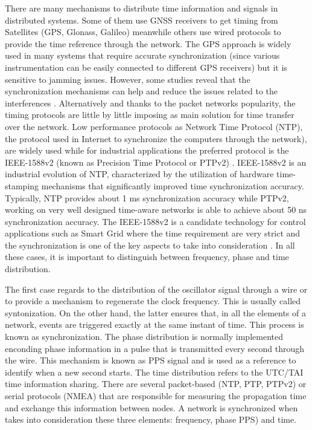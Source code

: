 There are many mechanisms to distribute time information and signals in distributed systems. Some of them use GNSS receivers to get timing from Satellites (GPS, Glonass, 
Galileo) meanwhile others use wired protocols to provide the time reference 
through the network. The GPS approach is widely used in many systems that require accurate synchronization (since various instrumentation can be easily connected to different GPS receivers) but it is sensitive to jamming issues. However, some studies reveal that the synchronization mechanisms can help and reduce the issues related to the interferences \cite{NOURA2016130}. Alternatively and thanks to the packet networks popularity, the timing protocols are little by little imposing as main solution for time transfer over the network. Low performance protocols as Network Time Protocol (NTP), the protocol used in Internet to synchronize the computers through the network), \cite{ntf:ntp_std} are widely used while for industrial applications the preferred protocol is the IEEE-1588v2 (known as Precision Time Protocol or PTPv2) \cite{ieee:ieee1588_std} \cite{itu:TG8275_1_Y_1369_1}. IEEE-1588v2 is an industrial evolution of NTP, characterized by the utilization of hardware time-stamping mechanisms that significantly improved time synchronization accuracy. Typically, NTP provides about 1 ms synchronization accuracy while PTPv2, working on very well designed time-aware networks is able to achieve about 50 ns synchronization accuracy. The IEEE-1588v2 is a candidate technology for control applications such as Smart Grid \cite{NAFI201623} where the time requirement are very strict and the synchronization is one of the key aspects to take into consideration \cite{COLAK2016396}.
In all these cases, it is important to distinguish between frequency, phase and time distribution.

The first case regards to the distribution of the oscillator signal through a wire or to provide a mechanism to regenerate the clock frequency. This is usually  called syntonization. On the other hand, the latter ensures that, in all the elements of a network, events are triggered exactly at the same instant of time. This process is known as synchronization.
The phase distribution is normally implemented enconding phase information in a pulse that is transmitted every second through the wire. This mechanism is known as PPS signal and is used as a reference to identify when a new second starts.
The time distribution refers to the UTC/TAI time information sharing. There are several packet-based (NTP, PTP, PTPv2) or serial protocols (NMEA) that are responsible for measuring the propagation time and exchange this information between nodes. 
A network is synchronized when takes into consideration these three elements: frequency, phase PPS) and time.

